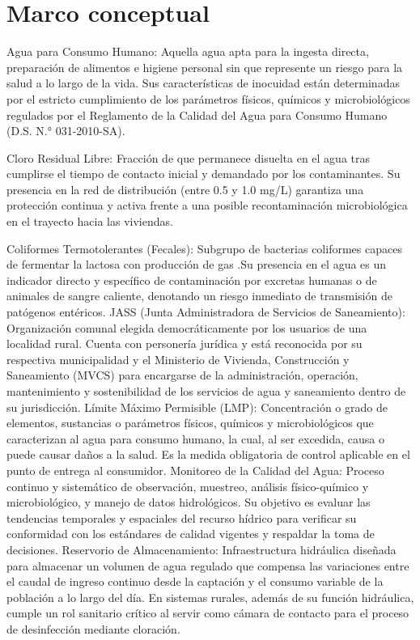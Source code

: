 \section{Marco conceptual}

Agua para Consumo Humano: Aquella agua apta para la ingesta directa, preparación de alimentos e higiene personal sin que represente un riesgo para la salud a lo largo de la vida. Sus características de inocuidad están determinadas por el estricto cumplimiento de los parámetros físicos, químicos y microbiológicos regulados por el Reglamento de la Calidad del Agua para Consumo Humano (D.S. N.° 031-2010-SA).

Cloro Residual Libre: Fracción de  que permanece disuelta en el agua tras cumplirse el tiempo de contacto inicial y demandado por los contaminantes. Su presencia en la red de distribución (entre 0.5 y 1.0 mg/L) garantiza una protección continua y activa frente a una posible recontaminación microbiológica en el trayecto hacia las viviendas.

Coliformes Termotolerantes (Fecales): Subgrupo de bacterias coliformes capaces de fermentar la lactosa con producción de gas .Su presencia en el agua es un indicador directo y específico de contaminación por excretas humanas o de animales de sangre caliente, denotando un riesgo inmediato de transmisión de patógenos entéricos.
JASS (Junta Administradora de Servicios de Saneamiento): Organización comunal elegida democráticamente por los usuarios de una localidad rural. Cuenta con personería jurídica y está reconocida por su respectiva municipalidad y el Ministerio de Vivienda, Construcción y Saneamiento (MVCS) para encargarse de la administración, operación, mantenimiento y sostenibilidad de los servicios de agua y saneamiento dentro de su jurisdicción.
 Límite Máximo Permisible (LMP): Concentración o grado de elementos, sustancias o parámetros físicos, químicos y microbiológicos que caracterizan al agua para consumo
humano, la cual, al ser excedida, causa o puede causar daños a la salud. Es la medida obligatoria de control aplicable en el punto de entrega al consumidor.
Monitoreo de la Calidad del Agua: Proceso continuo y sistemático de observación, muestreo, análisis físico-químico y microbiológico, y manejo de datos hidrológicos. Su objetivo es evaluar las tendencias temporales y espaciales del recurso hídrico para verificar su conformidad con los estándares de calidad vigentes y respaldar la toma de decisiones.
Reservorio de Almacenamiento: Infraestructura hidráulica diseñada para almacenar un volumen de agua regulado que compensa las variaciones entre el caudal de ingreso continuo desde la captación y el consumo variable de la población a lo largo del día. En sistemas rurales, además de su función hidráulica, cumple un rol sanitario crítico al servir como cámara de contacto para el proceso de desinfección mediante cloración.

